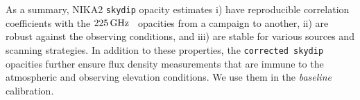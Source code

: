 As a summary, NIKA2 {\tt skydip} opacity estimates i) have reproducible
correlation coefficients with the $225\,\rm{GHz}$ \taumeter\ opacities from a
campaign to another, ii) are robust against the observing conditions,
and iii) are stable for various sources and scanning strategies. {\lp
In addition to these properties, the {\tt corrected skydip} opacities
further ensure flux density measurements that are immune to the
atmospheric and observing elevation conditions. We use them in
the \emph{baseline} calibration.}



